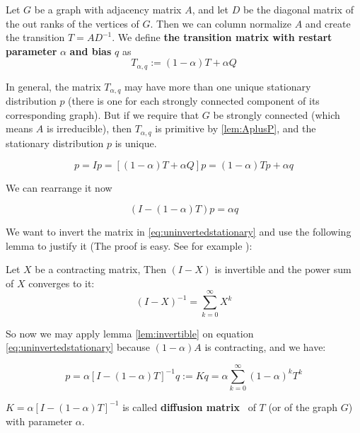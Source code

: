 \begin{mydef}
\label{def:Transitionbiased}
Let $G$ be a graph with adjacency matrix $A$, and let $D$ be the
diagonal matrix of the out ranks of the vertices of $G$. Then we can
column normalize $A$ and create the transition $T = AD^{-1}$.
We define \textbf{the transition matrix with restart parameter}
$\alpha$ \textbf{and bias} $q$ as
\[
T_{\alpha, q} :=
(1 - \alpha)T + \alpha Q
\]
\end{mydef}

In general, 
the matrix $T_{\alpha,q}$ may have more than one unique stationary distribution $p$ 
(there is one for each strongly connected
component of its corresponding graph). But if we require that $G$ be
strongly connected (which means $A$ is irreducible),
then $T_{\alpha,q}$ is primitive by \ref{lem:AplusP}, and the
stationary distribution $p$ is unique.

\[
p = Ip
= [(1 - \alpha)T + \alpha Q]p =  (1 - \alpha)Tp + \alpha q 
\]

We can rearrange it now

\begin{equation}
\label{eq:uninvertedstationary}
(I - (1 - \alpha)T)p = \alpha q
\end{equation}

We want to invert the matrix in \ref{eq:uninvertedstationary} and use the
following lemma to justify it (The proof is easy. See for example
\textcite{serre2010matrices}):

\begin{lemma}
\label{lem:invertible}
Let $X$ be a contracting matrix, Then $(I-X)$ is invertible and the power sum of
$X$ converges to it:
\[
(I - X)^{-1} = \sum_{k=0}^{\infty} X^k
\]
\end{lemma}

So now we may apply lemma \ref{lem:invertible} on equation
\ref{eq:uninvertedstationary} because $(1-\alpha)A$ is contracting, and we have:

\begin{equation}
\label{eq:diffkernel}
p = \alpha [I - (1 - \alpha)T]^{-1} q := K q = 
\alpha \sum_{k=0}^{\infty} (1 - \alpha)^k T^k
\end{equation}

\begin{mydef}
\label{def:diffusionmatrix}
$K = \alpha [I - (1 - \alpha)T]^{-1}$ is called \textbf{diffusion
matrix}~\cite{leiserson2015pan} of $T$ (or of the graph $G$) with parameter
$\alpha$.
\end{mydef}

